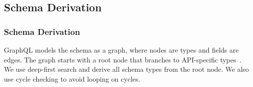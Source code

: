 
\subsection{Schema Derivation} 
\begin{frame}\frametitle{Schema Derivation}

GraphQL models the schema as a graph, where nodes are types and fields are edges. The graph starts with a root node that branches to API-specific types~\cite{migrating-to-gql}.  We use deep-first search and derive all schema types from the root node. We also use cycle checking to avoid looping on cycles.

\end{frame}
